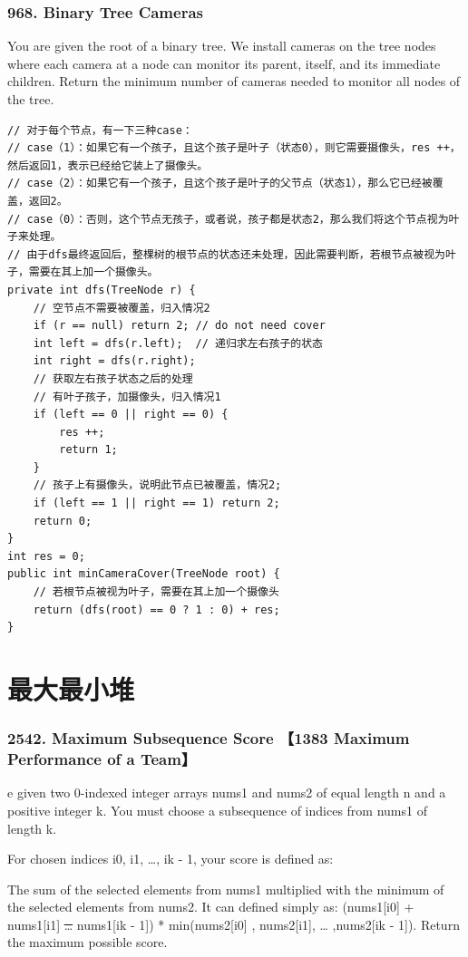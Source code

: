 \documentclass[9pt, b5paaper]{book}
\begin{document}
\subsection{968. Binary Tree Cameras}
\label{sec-3-0-11}
You are given the root of a binary tree. We install cameras on the tree nodes where each camera at a node can monitor its parent, itself, and its immediate children.
Return the minimum number of cameras needed to monitor all nodes of the tree.
\begin{verbatim}
// 对于每个节点，有一下三种case：
// case（1）：如果它有一个孩子，且这个孩子是叶子（状态0），则它需要摄像头，res ++，然后返回1，表示已经给它装上了摄像头。
// case（2）：如果它有一个孩子，且这个孩子是叶子的父节点（状态1），那么它已经被覆盖，返回2。
// case（0）：否则，这个节点无孩子，或者说，孩子都是状态2，那么我们将这个节点视为叶子来处理。
// 由于dfs最终返回后，整棵树的根节点的状态还未处理，因此需要判断，若根节点被视为叶子，需要在其上加一个摄像头。
private int dfs(TreeNode r) {
    // 空节点不需要被覆盖，归入情况2
    if (r == null) return 2; // do not need cover
    int left = dfs(r.left);  // 递归求左右孩子的状态
    int right = dfs(r.right);
    // 获取左右孩子状态之后的处理
    // 有叶子孩子，加摄像头，归入情况1
    if (left == 0 || right == 0) {
        res ++;
        return 1;
    }
    // 孩子上有摄像头，说明此节点已被覆盖，情况2; 
    if (left == 1 || right == 1) return 2;
    return 0;
}
int res = 0;
public int minCameraCover(TreeNode root) {
    // 若根节点被视为叶子，需要在其上加一个摄像头
    return (dfs(root) == 0 ? 1 : 0) + res;
}
\end{verbatim}

\chapter{最大最小堆}
\label{sec-4}
\subsection{2542. Maximum Subsequence Score 【1383 Maximum Performance of a Team】}
\label{sec-4-0-1}
e given two 0-indexed integer arrays nums1 and nums2 of equal length n and a positive integer k. You must choose a subsequence of indices from nums1 of length k.

For chosen indices i0, i1, \ldots{}, ik - 1, your score is defined as:

The sum of the selected elements from nums1 multiplied with the minimum of the selected elements from nums2.
It can defined simply as: (nums1[i0] + nums1[i1] \sout{\ldots{}} nums1[ik - 1]) * min(nums2[i0] , nums2[i1], \ldots{} ,nums2[ik - 1]).
Return the maximum possible score.
\end{document}
